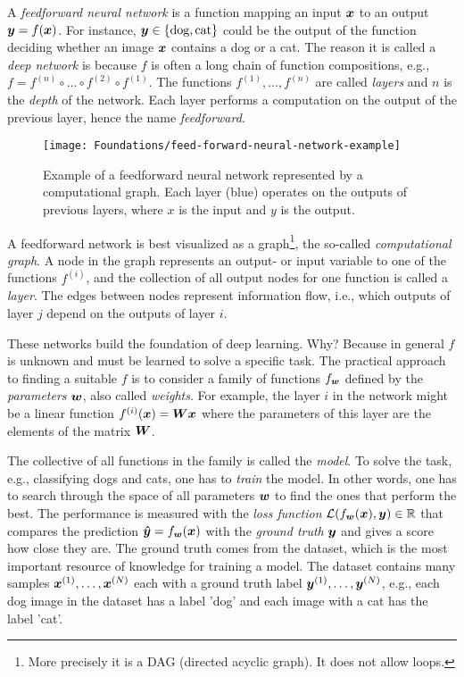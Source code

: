 		A \emph{feedforward neural network} is a function mapping an input $\bm{x}$ to an output $\bm{y} = f(\bm{x})$.
		For instance, $\bm{y} \in \{\text{dog}, \text{cat} \}$ could be the output of the function deciding whether an image $\bm{x}$ contains a dog or a cat. 
		The reason it is called a \emph{deep network} is because $f$ is often a long chain of function compositions, e.g., 
		$f = f^{(n)} \circ  \ldots  \circ f^{(2)} \circ f^{(1)}$.
		The functions $f^{(1)}, \dots, f^{(n)}$ are called \emph{layers} and $n$ is the \emph{depth} of the network.
		Each layer performs a computation on the output of the previous layer, hence the name \emph{feedforward}.
		\begin{figure}[t]
			\centering
			\texttt{[image: Foundations/feed-forward-neural-network-example]}
			\caption[Example of a feedforward neural network]
					{Example of a feedforward neural network represented by a computational graph. 
					 Each layer (blue) operates on the outputs of previous layers, where $x$ is the input and $y$ is the output.
					 \label{fig:example_feed_forward_network}}
		\end{figure}
		A feedforward network is best visualized as a graph\footnote{More precisely it is a DAG (directed acyclic graph). It does not allow loops.}, the so-called \emph{computational graph}.
		A node in the graph represents an output- or input variable to one of the functions $f^{(i)}$, and the collection of all output nodes for one function is called a \emph{layer}. 
		The edges between nodes represent information flow, i.e., which outputs of layer $j$ depend on the outputs of layer $i$.
		
		These networks build the foundation of deep learning.
		Why?
		Because in general $f$ is unknown and must be learned to solve a specific task.
		The practical approach to finding a suitable $f$ is to consider a family of functions $f_{\bm{w}}$ defined by the \emph{parameters} $\bm{w}$, also called \emph{weights}.
		For example, the layer $i$ in the network might be a linear function $f_{}^{(i)}(\bm{x}) = \bm{W} \bm{x}$ where the parameters of this layer are the elements of the matrix $\bm{W}$.
		
		The collective of all functions in the family is called the \emph{model}.
		To solve the task, e.g., classifying dogs and cats, one has to \emph{train} the model.
		In other words, one has to search through the space of all parameters $\bm{w}$ to find the ones that perform the best.
		The performance is measured with the \emph{loss function} 
		$\mathcal{L}(f_{\bm{w}}(\bm{x}), \bm{y}) \in \mathbb{R}$ that compares the prediction 
		$\bm{\hat{y}} = f_{\bm{w}}(\bm{x})$ with the \emph{ground truth} $\bm{y}$ and gives a score how close they are.
		The ground truth comes from the dataset, which is the most important resource of knowledge for training a model.
		The dataset contains many samples $\bm{x}^{(1)}, \dots, \bm{x}^{(N)}$ each with a ground truth label 
		$\bm{y}^{(1)}, \dots, \bm{y}^{(N)}$, e.g., each dog image in the dataset has a label 'dog' and each image with a cat has the label 'cat'.
		
